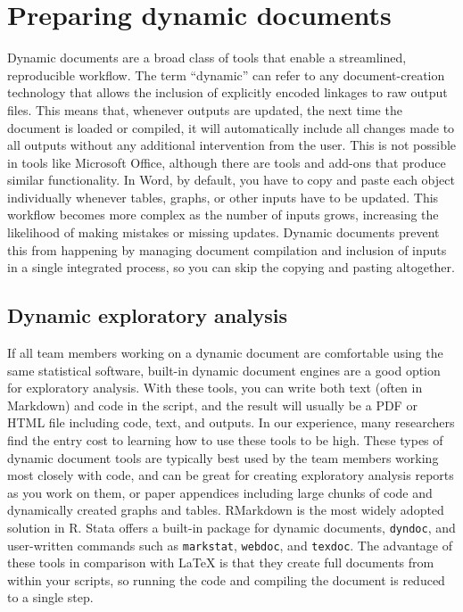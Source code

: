 \section{Preparing dynamic documents}

Dynamic documents are a broad class of tools that enable a streamlined, reproducible workflow.
The term ``dynamic'' can refer to any document-creation technology
that allows the inclusion of explicitly encoded linkages to raw output files.
This means that, whenever outputs are updated,
the next time the document is loaded or compiled, it will automatically include
all changes made to all outputs without any additional intervention from the user.
This is not possible in tools like Microsoft Office,
although there are tools and add-ons that produce similar functionality.
In Word, by default, you have to copy and paste each object individually
whenever tables, graphs, or other inputs have to be updated.
This workflow becomes more complex as the number of inputs grows,
increasing the likelihood of making mistakes or missing updates.
Dynamic documents prevent this from happening by managing document compilation and
inclusion of inputs in a single integrated process,
so you can skip the copying and pasting altogether.

\subsection{Dynamic exploratory analysis}

If all team members working on a dynamic document are comfortable using the same statistical software,
built-in dynamic document engines are a good option for exploratory analysis.
With these tools,
you can write both text (often in Markdown) and code in the script,
and the result will usually be a PDF or HTML file including code, text, and outputs.
In our experience, many researchers find the entry cost to learning how to use these tools to be high.
These types of dynamic document tools are typically best used by the team members working most closely with code,
and can be great for creating exploratory analysis reports as you work on them,
or paper appendices including large chunks of code and dynamically created graphs and tables.
RMarkdown is the most widely adopted solution in R.
Stata offers a built-in package for dynamic documents, \texttt{dyndoc},
and user-written commands such as \texttt{markstat},
\texttt{webdoc}, and
\texttt{texdoc}.
The advantage of these tools in comparison with LaTeX is that
they create full documents from within your scripts,
so running the code and compiling the document is reduced to a single step.

